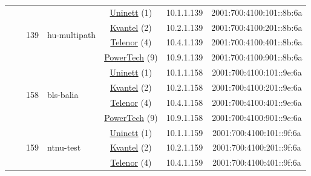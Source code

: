 \begin{small}
\begin{center}
\begin{longtable}{|c|c|c|c|c|c|c|c|}
  &  & \multirow{4}{*}{\tiny{139}} & \multicolumn{1}{|l|}{\multirow{4}{*}{\tiny{hu-multipath}}} & \multicolumn{2}{|c|}{\tiny{\href{https://www.uninett.no}{Uninett} (1)}} & \tiny{10.1.1.139} & \tiny{2001:700:4100:101::8b:6a} \\* \cline{5-5}\cline{6-6}\cline{7-7}\cline{8-8}
  &  &  &  & \multicolumn{2}{|c|}{\tiny{\href{http://kvantel.no}{Kvantel} (2)}} & \tiny{10.2.1.139} & \tiny{2001:700:4100:201::8b:6a} \\* \cline{5-5}\cline{6-6}\cline{7-7}\cline{8-8}
  &  &  &  & \multicolumn{2}{|c|}{\tiny{\href{https://www.telenor.no}{Telenor} (4)}} & \tiny{10.4.1.139} & \tiny{2001:700:4100:401::8b:6a} \\* \cline{5-5}\cline{6-6}\cline{7-7}\cline{8-8}
  &  &  &  & \multicolumn{2}{|c|}{\tiny{\href{http://www.powertech.no}{PowerTech} (9)}} & \tiny{10.9.1.139} & \tiny{2001:700:4100:901::8b:6a} \\* \cline{3-3}\cline{4-4}\cline{5-5}\cline{6-6}\cline{7-7}\cline{8-8}
  &  & \multirow{4}{*}{\tiny{158}} & \multicolumn{1}{|l|}{\multirow{4}{*}{\tiny{bls-balia}}} & \multicolumn{2}{|c|}{\tiny{\href{https://www.uninett.no}{Uninett} (1)}} & \tiny{10.1.1.158} & \tiny{2001:700:4100:101::9e:6a} \\* \cline{5-5}\cline{6-6}\cline{7-7}\cline{8-8}
  &  &  &  & \multicolumn{2}{|c|}{\tiny{\href{http://kvantel.no}{Kvantel} (2)}} & \tiny{10.2.1.158} & \tiny{2001:700:4100:201::9e:6a} \\* \cline{5-5}\cline{6-6}\cline{7-7}\cline{8-8}
  &  &  &  & \multicolumn{2}{|c|}{\tiny{\href{https://www.telenor.no}{Telenor} (4)}} & \tiny{10.4.1.158} & \tiny{2001:700:4100:401::9e:6a} \\* \cline{5-5}\cline{6-6}\cline{7-7}\cline{8-8}
  &  &  &  & \multicolumn{2}{|c|}{\tiny{\href{http://www.powertech.no}{PowerTech} (9)}} & \tiny{10.9.1.158} & \tiny{2001:700:4100:901::9e:6a} \\* \cline{3-3}\cline{4-4}\cline{5-5}\cline{6-6}\cline{7-7}\cline{8-8}
  &  & \multirow{4}{*}{\tiny{159}} & \multicolumn{1}{|l|}{\multirow{4}{*}{\tiny{ntnu-test}}} & \multicolumn{2}{|c|}{\tiny{\href{https://www.uninett.no}{Uninett} (1)}} & \tiny{10.1.1.159} & \tiny{2001:700:4100:101::9f:6a} \\* \cline{5-5}\cline{6-6}\cline{7-7}\cline{8-8}
  &  &  &  & \multicolumn{2}{|c|}{\tiny{\href{http://kvantel.no}{Kvantel} (2)}} & \tiny{10.2.1.159} & \tiny{2001:700:4100:201::9f:6a} \\* \cline{5-5}\cline{6-6}\cline{7-7}\cline{8-8}
  &  &  &  & \multicolumn{2}{|c|}{\tiny{\href{https://www.telenor.no}{Telenor} (4)}} & \tiny{10.4.1.159} & \tiny{2001:700:4100:401::9f:6a} \\* \cline{5-5}\cline{6-6}\cline{7-7}\cline{8-8}

\end{longtable}
\end{center}
\end{small}
